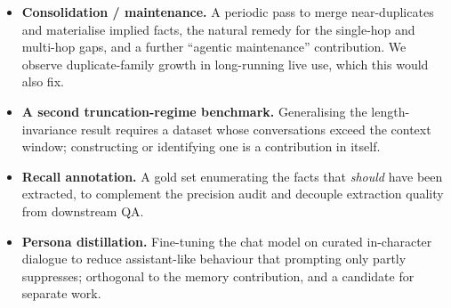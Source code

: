 \begin{itemize}
  \item \textbf{Consolidation / maintenance.} A periodic pass to merge near-duplicates and
  materialise implied facts, the natural remedy for the single-hop and
  multi-hop gaps, and a further ``agentic maintenance'' contribution. We observe
  duplicate-family growth in long-running live use, which this would also fix.
  \item \textbf{A second truncation-regime benchmark.} Generalising the
  length-invariance result requires a dataset whose conversations exceed the
  context window; constructing or identifying one is a contribution in itself.
  \item \textbf{Recall annotation.} A gold set enumerating the facts that \emph{should} have
  been extracted, to complement the precision audit and decouple extraction
  quality from downstream QA.
  \item \textbf{Persona distillation.} Fine-tuning the chat model on curated in-character
  dialogue to reduce assistant-like behaviour that prompting only partly
  suppresses; orthogonal to the memory contribution, and a candidate for
  separate work.
\end{itemize}
